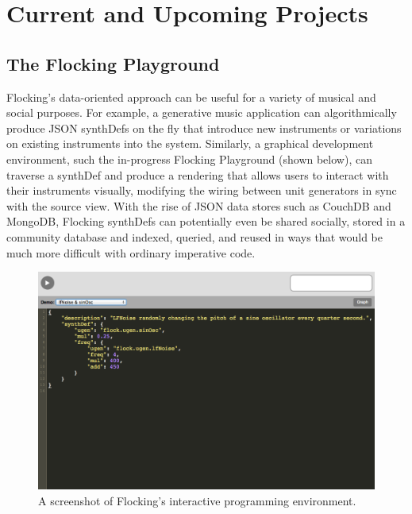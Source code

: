 \documentclass{article}
\begin{document}
\section{Current and Upcoming Projects}

\subsection{The Flocking Playground}

Flocking's data-oriented approach can be useful for a variety of musical and social purposes. For example, a generative music application can algorithmically produce JSON synthDefs on the fly that introduce new instruments or variations on existing instruments into the system. Similarly, a graphical development environment, such the in-progress Flocking Playground (shown below), can traverse a synthDef and produce a rendering that allows users to interact with their instruments visually, modifying the wiring between unit generators in sync with the source view. With the rise of JSON data stores such as CouchDB and MongoDB, Flocking synthDefs can potentially even be shared socially, stored in a community database and indexed, queried, and reused in ways that would be much more difficult with ordinary imperative code.

\begin{figure}[h]
\centering
\includegraphics[width=0.9\columnwidth]{images/flocking-playground-source-view.png}
\caption{ A screenshot of Flocking's interactive programming environment.\label{fig:playground}}
\end{figure}
\end{document}
